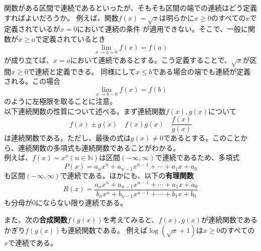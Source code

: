 \documentclass[a4j,dvipdfmx]{jsarticle}
\begin{document}
                関数がある区間で連続であるといったが、そもそも区間の端での連続はどう定義すればよいだろうか。
                例えば、関数$f(x)=\sqrt{x}$は明らかに$x\geq 0$のすべての$x$で定義されているが$x=0$において連続の条件
                が適用できない。そこで、一般に関数が$x\geq a$で定義されているとき
                \begin{equation}
                    \lim_{x\to a+0}f(x)=f(a)
                \end{equation}
                が成り立てば、$x=a$において連続であるとする。こう定義することで、$\sqrt{x}$が区間$x\geq 0$で連続と定義できる。
                同様にして$x\leq b$である場合の端でも連続が定義される。この場合
                \begin{equation}
                    \lim_{x\to b-0}f(x)=f(b)
                \end{equation}
                のように左極限を取ることに注意。\\

                以下連続関数の性質について述べる。まず連続関数$f(x),g(x)$について
                \begin{equation}
                    f(x)\pm g(x)\quad f(x)g(x)\quad \frac{f(x)}{g(x)}
                \end{equation}
                は連続関数である。ただし、最後の式は$g(x)\neq 0$であるとする。このことから、連続関数の多項式も連続関数であることがわかる。\\

                \noindent
                例えば、$f(x)=x^n(n\in\mathbb{N})$は区間$(-\infty,\infty)$で連続であるため、多項式
                \begin{equation}
                    P(x)=a_nx^n+a_{n-1}x^{n-1}+\cdots+a_{1}x+a_0
                \end{equation}
                も区間$(-\infty,\infty)$で連続である。ほかにも、以下の\textbf{有理関数}
                \begin{equation}
                    R(x)=\frac{a_nx^n+a_{n-1}x^{n-1}+\cdots+a_{1}x+a_0}{b_nx^n+b_{n-1}x^{n-1}+\cdots+b_{1}x+b_0}
                \end{equation}
                も分母が0にならない限り連続である。

                また、次の\textbf{合成関数}$f(g(x))$を考えてみると、$f(x),g(x)$が連続関数であるかぎり$f(g(x))$も連続関数である。
                例えば$\log(\sqrt{x}+1)$は$x\geq 0$のすべての$x$で連続である。\\
\end{document}
